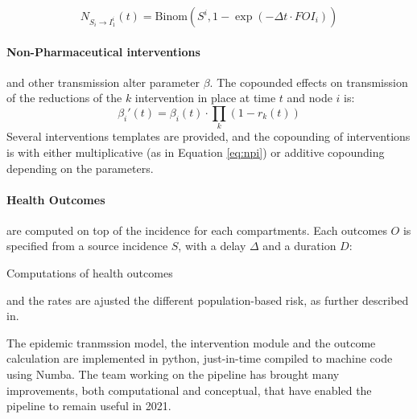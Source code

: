 \begin{equation}
N_{S_i \longrightarrow I_1^{i}}(t) = \text{Binom}(S^i, 1 - \exp(-\Delta t \cdot FOI_i))
\end{equation}

\paragraph{Non-Pharmaceutical interventions} and other transmission alter parameter $\beta$. The copounded effects on transmission of the reductions of the $k$ intervention in place at time $t$ and node $i$ is:
\begin{equation}
	\beta_i'(t) =  \beta_i(t) \cdot  \prod_k \left(1-r_k(t) \right) \label{eq:npi}%
\end{equation}
Several interventions templates are provided, and the copounding  of interventions is with either multiplicative (as in Equation \eqref{eq:npi}) or additive copounding depending on the parameters. 

\paragraph{Health Outcomes} are computed on top of the incidence for each compartments. Each outcomes $O$  is specified from a source incidence $S$, with a delay $\Delta$ and a duration $D$:

 \begin{algorithm}[H]
\SetAlgoLined
 \caption{Computations of health outcomes}
\end{algorithm}
and the rates are ajusted the different population-based risk, as further described in\cite{Lemaitre:ScenarioModelingPipeline:2021}.



The epidemic tranmssion model, the intervention module and the outcome calculation are implemented in python, just-in-time compiled to machine code using Numba\cite{Lam:NumbaLLVMbasedPython:2015}. The team working on the pipeline has brought many improvements, both computational and conceptual, that have enabled the pipeline to remain useful in 2021. 

